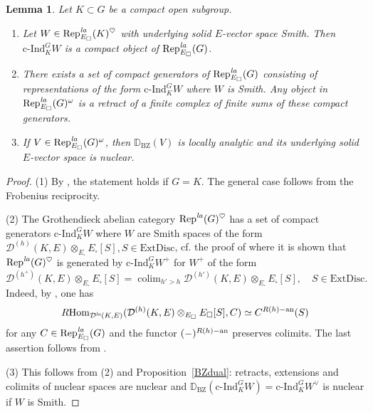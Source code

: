 \documentclass[a4paper,10pt]{amsart}
\theoremstyle{remark}
\theoremstyle{definition}
\theoremstyle{plain}
\newtheorem{lemma}[theorem]{Lemma}
\numberwithin{equation}{section}
\newcommand{\bbD}{{\mathbb D}}
\newcommand{\calD}{{\mathcal D}}
\newcommand{\an}{{\rm an}}
\newcommand{\Hom}{{\rm Hom}}
\newcommand{\la}{{\it la}}
\newcommand{\Rep}{{\rm Rep}}
\newcommand{\cInd}{\mathrm{c\text{-}Ind}}
\newcommand{\BZ}{\ensuremath{\mathrm{BZ}}}
\DeclareMathOperator{\colim}{colim}
\begin{document}
\begin{lemma}\label{lem:compact-induction-Smith}
Let $K\subset G$ be a compact open subgroup.
\begin{enumerate}
	\item Let $W\in\Rep^{\la}_{E_{\square}}(K)^{\heartsuit}$ with underlying solid $E$-vector space Smith. Then $\cInd_K^G W$ is a compact object of $\Rep^{\la}_{E_{\square}}(G)$.
	\item There exists a set of compact generators of $\Rep^{\la}_{E_{\square}}(G)$ consisting of representations of the form $\cInd_K^G W$ where $W$ is Smith. Any object in $\Rep^{\la}_{E_{\square}}(G)^{\omega}$ is a retract of a finite complex of finite sums of these compact generators.
	\item If $V\in \Rep^{\la}_{E_{\square}}(G)^{\omega}$, then $\bbD_{\BZ}(V)$ is locally analytic and its underlying solid $E$-vector space is nuclear.
\end{enumerate}
\end{lemma}
\begin{proof}
(1) By \cite[Prop.~2.37(2)]{mikami2026finiteness}, the statement holds if $G=K$. The general case follows from the Frobenius reciprocity.

(2) The Grothendieck abelian category $\mathrm{Rep}^{\la}(G)^{\heartsuit}$ has a set of compact generators $\cInd_K^GW$ where $W$ are Smith spaces of the form $\calD^{(h)}(K,E)\otimes_{E_{\square}}E_{\square}[S], S\in \mathrm{ExtDisc}$, cf. the proof of \cite[Prop.~3.3.6]{JC23} where it is shown that $\mathrm{Rep}^{\la}(G)^{\heartsuit}$ is generated by $\cInd_K^GW^+$ for $W^+$ of the form 
	\[\calD^{(h^+)}(K,E)\otimes_{E_{\square}}E_{\square}[S]=\colim_{h'>h}\calD^{(h')}(K,E)\otimes_{E_{\square}}E_{\square}[S],\quad S\in \mathrm{ExtDisc}.\] 
	Indeed, by \cite[Thm.~4.36(1)]{rodrigues2022solid}, one has 
	\begin{align*}
		R\Hom_{\calD^{\la}(K,E)}(\calD^{(h)}(K,E)\otimes_{E_{\square}}E_{\square}[S],C)\simeq C^{R(h)-\an}(S)
	\end{align*}
	for any $C\in \Rep^{\la}_{E_{\square}}(G)$ and the functor $(-)^{R(h)-\an}$ preserves colimits. The last assertion follows from \cite[{\href{https://stacks.math.columbia.edu/tag/0948}{Tag 0948}}]{stacks-project}. 

	(3) This follows from (2) and Proposition~\ref{BZdual}: retracts, extensions and colimits of nuclear spaces are nuclear \cite[Prop.~5.33, Lem.~5.40]{andreychev2021pseudocoherent} and $\bbD_{\BZ}(\cInd_K^GW)=\cInd_K^GW^{\vee}$ is nuclear if $W$ is Smith.
\end{proof}
\end{document}
